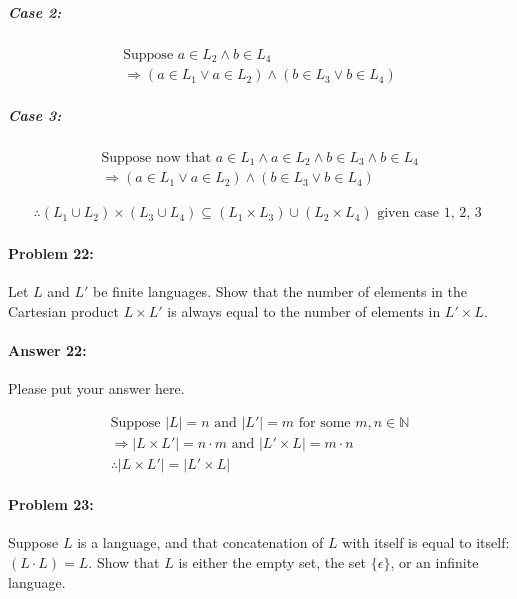 \documentclass[10pt]{article}
\begin{document}
\subparagraph{Case 2:}
\begin{gather*}
    \text{Suppose } a\in L_2 \wedge b\in L_4\\
    \Rightarrow (a\in L_1 \vee a\in L_2) \wedge (b\in L_3 \vee b\in L_4)
\end{gather*}

\subparagraph{Case 3:}
\begin{gather*}
    \text{Suppose now that } a\in L_1 \wedge a\in L_2 \wedge b\in L_3 \wedge b\in L_4\\
    \Rightarrow (a\in L_1 \vee a\in L_2) \wedge (b\in L_3 \vee b\in L_4) 
\end{gather*}

\begin{gather*}
    \therefore (L_1 \cup L_2) \times (L_3 \cup L_4) \subseteq (L_1 \times L_3) \cup (L_2 \times L_4) \text{ given case 1, 2, 3 }  
\end{gather*}

\noindent\hrulefill %

\paragraph{Problem 22:} 
Let $L$ and $L'$ be finite languages. Show that the number of elements
in the Cartesian product $L \times L'$ is always equal to the number
of elements in $L' \times L$.

\paragraph{Answer 22:} Please put your answer here.

\begin{gather*}
    \text{Suppose } |L| = n \text{ and } |L'| = m \text{ for some } m,n \in \mathbb{N}\\
    \Rightarrow |L\times L'| = n\cdot m \text{ and } |L'\times L| = m\cdot n\\
    \therefore |L\times L'| = |L'\times L|
\end{gather*}

\noindent\hrulefill %

\paragraph{Problem 23:}

Suppose $L$ is a language, and that concatenation of $L$ with itself is equal to itself:
$(L\cdot L) = L$. Show that $L$ is either the empty set, 
the set $\{\epsilon\}$, or an infinite language.
\end{document}
